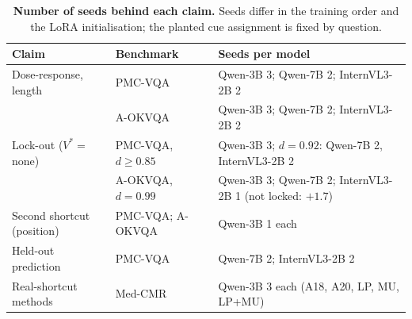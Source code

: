 \begin{table}[tbp]
  \centering
  \footnotesize
  \setlength{\tabcolsep}{2.4pt}
  \begin{tabular}{@{}p{}p{}p{}@{}}
    \toprule
    Claim & Benchmark & Seeds per model \\
    \midrule
    Dose-response, length & PMC-VQA & Qwen-3B 3; Qwen-7B 2; InternVL3-2B 2 \\
     & A-OKVQA & Qwen-3B 3; Qwen-7B 2; InternVL3-2B 2 \\
    Lock-out ($V^\ast=$ none) & PMC-VQA, $d\ge0.85$ & Qwen-3B 3; $d=0.92$: Qwen-7B 2, InternVL3-2B 2 \\
     & A-OKVQA, $d=0.99$ & Qwen-3B 3; Qwen-7B 2; InternVL3-2B 1 (not locked: $+1.7$) \\
    Second shortcut (position) & PMC-VQA; A-OKVQA & Qwen-3B 1 each \\
    Held-out prediction & PMC-VQA & Qwen-7B 2; InternVL3-2B 2 \\
    Real-shortcut methods & Med-CMR & Qwen-3B 3 each (A18, A20, LP, MU, LP+MU) \\
    \bottomrule
  \end{tabular}
  \caption{\textbf{Number of seeds behind each claim.} Seeds differ in the training order and the LoRA initialisation; the planted cue assignment is fixed by question.}
  \label{tab:seeds-sup}
\end{table}

